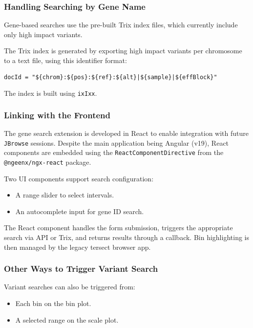 \documentclass[12pt]{article}
\begin{document}
\subsubsection{Handling Searching by Gene Name}

Gene-based searches use the pre-built Trix index files, which currently include only high impact variants.

The Trix index is generated by exporting high impact variants per chromosome to a text file, using this identifier format:

\begin{verbatim}
docId = "${chrom}:${pos}:${ref}:${alt}|${sample}|${effBlock}"
\end{verbatim}

The index is built using \texttt{ixIxx}.

\subsubsection{Linking with the Frontend}

The gene search extension is developed in React to enable integration with future \texttt{JBrowse} sessions. Despite the main application being Angular (v19), React components are embedded using the \texttt{ReactComponentDirective} from the \texttt{@ngeenx/ngx-react} package.

Two UI components support search configuration:
\begin{itemize}
  \item A range slider to select intervals.
  \item An autocomplete input for gene ID search.
\end{itemize}

The React component handles the form submission, triggers the appropriate search via API or Trix, and returns results through a callback. Bin highlighting is then managed by the legacy tersect browser app.

\subsubsection{Other Ways to Trigger Variant Search}

Variant searches can also be triggered from:
\begin{itemize}
  \item Each bin on the bin plot.
  \item A selected range on the scale plot.
\end{itemize}
\end{document}
